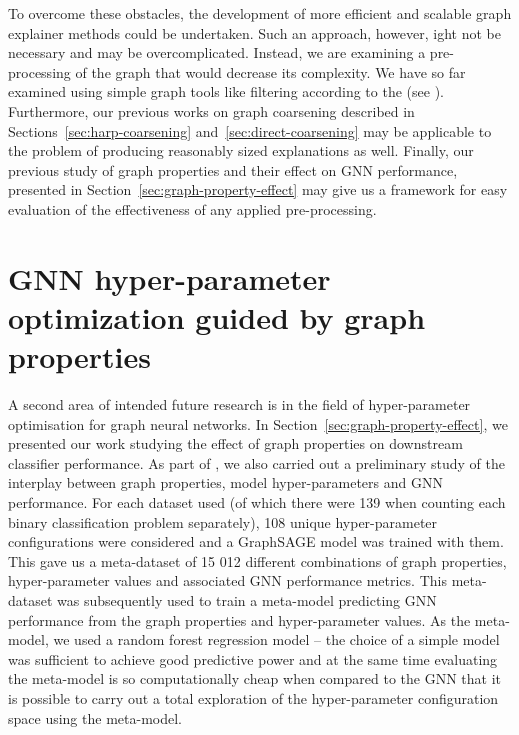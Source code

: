 To overcome these obstacles, the development of more efficient and scalable graph explainer methods could be undertaken. Such an approach, however, ight not be necessary and may be overcomplicated. Instead, we are examining a pre-processing of the graph that would decrease its complexity. We have so far examined using simple graph tools like filtering according to the  (see \cite{zhou_rich-club_2004}). Furthermore, our previous works on graph coarsening described in Sections~\ref{sec:harp-coarsening} and~\ref{sec:direct-coarsening} may be applicable to the problem of producing reasonably sized explanations as well. Finally, our previous study of graph properties and their effect on GNN performance, presented in Section~\ref{sec:graph-property-effect} may give us a framework for easy evaluation of the effectiveness of any applied pre-processing.

\section{GNN hyper-parameter optimization guided by graph properties}
\label{sec:gnn-hpo}

A second area of intended future research is in the field of hyper-parameter optimisation for graph neural networks. In Section~\ref{sec:graph-property-effect}, we presented our work studying the effect of graph properties on downstream classifier performance. As part of \cite{prochazka_which_2023}, we also carried out a preliminary study of the interplay between graph properties, model hyper-parameters and GNN performance. For each dataset used (of which there were 139 when counting each binary classification problem separately), 108 unique hyper-parameter configurations were considered and a GraphSAGE model was trained with them. This gave us a meta-dataset of 15 012 different combinations of graph properties, hyper-parameter values and associated GNN performance metrics. This meta-dataset was subsequently used to train a meta-model predicting GNN performance from the graph properties and hyper-parameter values. As the meta-model, we used a random forest regression model -- the choice of a simple model was sufficient to achieve good predictive power and at the same time evaluating the meta-model is so computationally cheap when compared to the GNN that it is possible to carry out a total exploration of the hyper-parameter configuration space using the meta-model.

